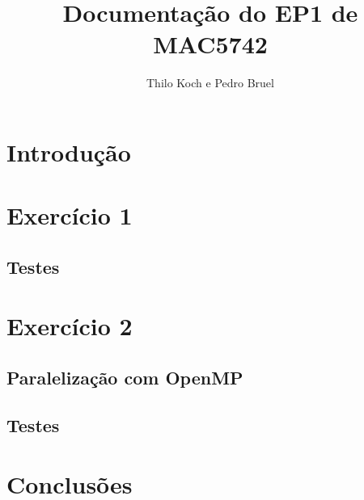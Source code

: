 \documentclass[a4paper, 12pt]{article}
\begin{document}
\hypersetup{backref,pdfpagemode=FullScreen,colorlinks=true}

\title{Documentação do EP1 de MAC5742}
\author{Thilo Koch e Pedro Bruel}
\date{}
\maketitle

\section{Introdução} \label{sec:intro}

\section{Exercício 1}

\subsection{Testes}

\section{Exercício 2}

\subsection{Paralelização com OpenMP}

\subsection{Testes}

\section{Conclusões}

%
%
\end{document}

